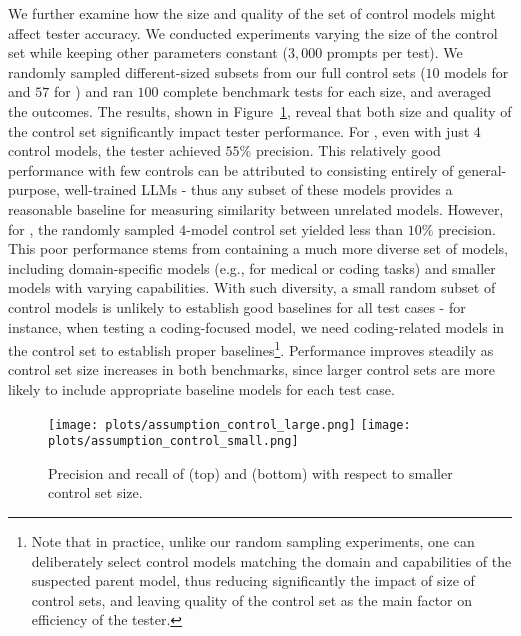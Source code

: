 We further examine how the size and quality of the set of control models might affect tester accuracy. We conducted experiments varying the size of the control set while keeping other parameters constant ($3,000$ prompts per test). We randomly sampled different-sized subsets from our full control sets ($10$ models for \bencho and $57$ for \bencht) and ran $100$ complete benchmark tests for each size, and averaged the outcomes. The results, shown in Figure~\ref{fig:eval:assumption_control}, reveal that both size and quality of the control set significantly impact tester performance. 
%
For \bencho, even with just $4$ control models, the tester achieved $55\%$ precision. This relatively good performance with few controls can be attributed to \bencho consisting entirely of general-purpose, well-trained LLMs - thus any subset of these models provides a reasonable baseline for measuring similarity between unrelated models. However, for \bencht, the randomly sampled $4$-model control set yielded less than $10\%$ precision. This poor performance stems from \bencht containing a much more diverse set of models, including domain-specific models (e.g., for medical or coding tasks) and smaller models with varying capabilities. With such diversity, a small random subset of control models is unlikely to establish good baselines for all test cases - for instance, when testing a coding-focused model, we need coding-related models in the control set to establish proper baselines\footnote{Note that in practice, unlike our random sampling experiments, one can deliberately select control models matching the domain and capabilities of the suspected parent model, thus reducing significantly the impact of size of control sets, and leaving quality of the control set as the main factor on efficiency of the tester.}. Performance improves steadily as control set size increases in both benchmarks, since larger control sets are more likely to include appropriate baseline models for each test case. 

\begin{figure}[t]
    \centering
    \subfigure
    {
        \texttt{[image: plots/assumption\_control\_large.png]}
    }
    \subfigure
    {
        \texttt{[image: plots/assumption\_control\_small.png]}
    }
    \caption{Precision and recall of \bencht (top) and \bencho (bottom) with respect to smaller control set size. }
    \label{fig:eval:assumption_control}
\end{figure}




